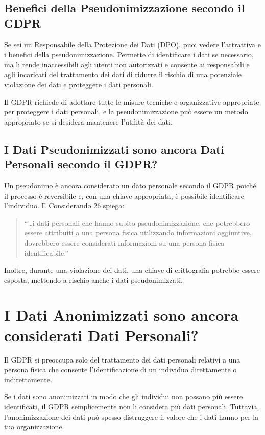 \subsection{Benefici della Pseudonimizzazione secondo il GDPR}
Se sei un Responsabile della Protezione dei Dati (DPO), puoi vedere l'attrattiva e i benefici della pseudonimizzazione. Permette di identificare i dati se necessario, ma li rende inaccessibili agli utenti non autorizzati e consente ai responsabili e agli incaricati del trattamento dei dati di ridurre il rischio di una potenziale violazione dei dati e proteggere i dati personali.

Il GDPR richiede di adottare tutte le misure tecniche e organizzative appropriate per proteggere i dati personali, e la pseudonimizzazione può essere un metodo appropriato se si desidera mantenere l'utilità dei dati.

\subsection{I Dati Pseudonimizzati sono ancora Dati Personali secondo il GDPR?}
Un pseudonimo è ancora considerato un dato personale secondo il GDPR poiché il processo è reversibile e, con una chiave appropriata, è possibile identificare l'individuo. Il Considerando 26 spiega:
\begin{quote}
“…i dati personali che hanno subito pseudonimizzazione, che potrebbero essere attribuiti a una persona fisica utilizzando informazioni aggiuntive, dovrebbero essere considerati informazioni su una persona fisica identificabile.”
\end{quote}

Inoltre, durante una violazione dei dati, una chiave di crittografia potrebbe essere esposta, mettendo a rischio anche i dati pseudonimizzati.

\section{I Dati Anonimizzati sono ancora considerati Dati Personali?}
Il GDPR si preoccupa solo del trattamento dei dati personali relativi a una persona fisica che consente l'identificazione di un individuo direttamente o indirettamente.

Se i dati sono anonimizzati in modo che gli individui non possano più essere identificati, il GDPR semplicemente non li considera più dati personali. Tuttavia, l'anonimizzazione dei dati può spesso distruggere il valore che i dati hanno per la tua organizzazione.
